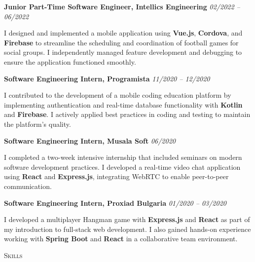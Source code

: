 \documentclass[a4paper,10pt]{article}
\newcommand{\textwithhr}[1]{
\textsc{#1}

\vspace{-5mm} \hrulefill
}
\begin{document}
\textbf{Junior Part-Time Software Engineer, Intellics Engineering} \hspace*{\fill} \textit{02/2022 -- 06/2022}  

I designed and implemented a mobile application using \textbf{Vue.js}, \textbf{Cordova}, and \textbf{Firebase} to streamline the scheduling and coordination of football games for social groups.  
I independently managed feature development and debugging to ensure the application functioned smoothly.  

\textbf{Software Engineering Intern, Programista} \hspace*{\fill} \textit{11/2020 -- 12/2020}  

I contributed to the development of a mobile coding education platform by implementing authentication and real-time database functionality with \textbf{Kotlin} and \textbf{Firebase}.  
I actively applied best practices in coding and testing to maintain the platform's quality.

\textbf{Software Engineering Intern, Musala Soft} \hspace*{\fill} \textit{06/2020}  

I completed a two-week intensive internship that included seminars on modern software development practices.  
I developed a real-time video chat application using \textbf{React} and \textbf{Express.js}, integrating WebRTC to enable peer-to-peer communication.  

\textbf{Software Engineering Intern, Proxiad Bulgaria} \hspace*{\fill} \textit{01/2020 -- 03/2020}  

I developed a multiplayer Hangman game with \textbf{Express.js} and \textbf{React} as part of my introduction to full-stack web development.  
I also gained hands-on experience working with \textbf{Spring Boot} and \textbf{React} in a collaborative team environment.

\textwithhr{Skills}
\end{document}
